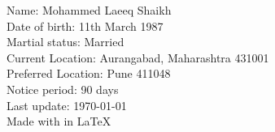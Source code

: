 \begin{center}

        Name: Mohammed Laeeq Shaikh\\
        
        Date of birth: 11th March 1987\\
        
        Martial status: Married\\
        
        Current Location: Aurangabad, Maharashtra 431001\\
        
        Preferred Location: Pune 411048\\
        
        Notice period: 90 days\\
        \vspace{3mm}
        Last update: \today \\
        \vspace{3mm}
        Made with \large {} \space in \LaTeX \space \\%

\end{center}